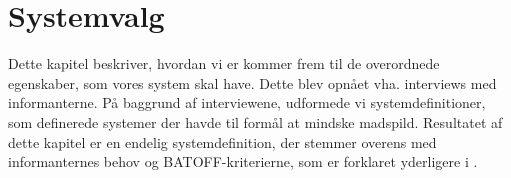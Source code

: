 \chapter{Systemvalg}
\label{chap:systemvalg}
Dette kapitel beskriver, hvordan vi er kommer frem til de overordnede egenskaber, som vores system skal have. Dette blev opnået vha. interviews med informanterne. På baggrund af interviewene, udformede vi systemdefinitioner, som definerede systemer der havde til formål at mindske madspild. Resultatet af dette kapitel er en endelig systemdefinition, der stemmer overens med informanternes behov og BATOFF-kriterierne, som er forklaret yderligere i .





